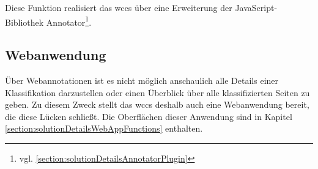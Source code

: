         Diese Funktion realisiert das \gls{wccs} über eine Erweiterung der JavaScript-Bibliothek
        Annotator\footnote{vgl. \ref{section:solutionDetailsAnnotatorPlugin}}.
    
    \subsection{Webanwendung}
        Über Webannotationen ist es nicht möglich anschaulich alle Details einer Klassifikation darzustellen
        oder einen Überblick über alle klassifizierten Seiten zu geben.
        Zu diesem Zweck stellt das \gls{wccs} deshalb auch eine Webanwendung bereit,
        die diese Lücken schließt.
        Die Oberflächen dieser Anwendung sind in Kapitel \ref{section:solutionDetailsWebAppFunctions}
        enthalten.
